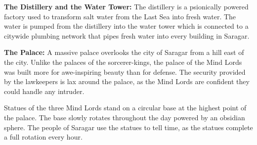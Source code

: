 {
	\textbf{The Distillery and the Water Tower:} The distillery is a psionically powered factory used to transform salt water from the Last Sea into fresh water. The water is pumped from the distillery into the water tower which is connected to a citywide plumbing network that pipes fresh water into every building in Saragar.

	\textbf{The Palace:} A massive palace overlooks the city of Saragar from a hill east of the city. Unlike the palaces of the sorcerer-kings, the palace of the Mind Lords was built more for awe-inspiring beauty than for defense. The security provided by the lawkeepers is lax around the palace, as the Mind Lords are confident they could handle any intruder.

	Statues of the three Mind Lords stand on a circular base at the highest point of the palace. The base slowly rotates throughout the day powered by an obsidian sphere. The people of Saragar use the statues to tell time, as the statues complete a full rotation every hour.
}
